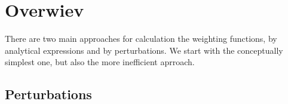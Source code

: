 \section{Overwiev}
\label{sec:wfuns:overw}

There are two main approaches for calculation the weighting functions, by
analytical expressions and by perturbations. We start with the conceptually
simplest one, but also the more inefficient aprroach.


\subsection{Perturbations}
\label{sec:wfuns:pert}

